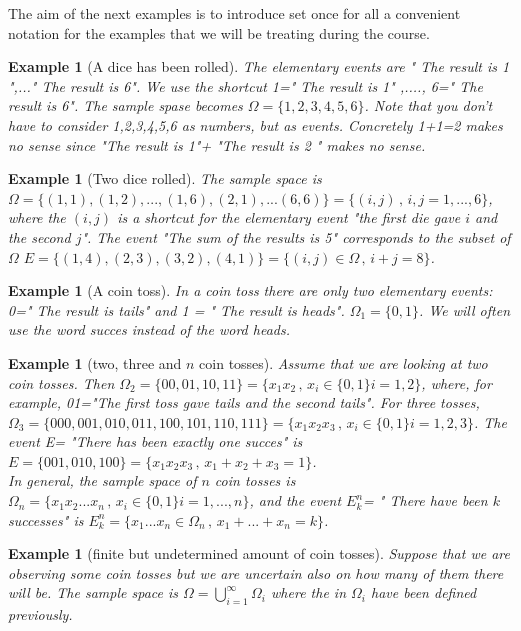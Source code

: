 \documentclass[12pt]{article}
\newtheorem{example}[theorem]{Example}
\newcommand{\<}{{\langle \!\! \langle}}
\renewcommand{\>}{{\rangle \!\! \rangle}}
\begin{document}
The aim of the next examples is to introduce set once for all a convenient notation for the examples that we will be treating during the course.

\begin{example}[A dice has been rolled]
The elementary events are " The result is 1 ",..." The result is 6". We use the shortcut 1=" The result is 1" ,...., 6=" The result is 6". The sample spase becomes $\Omega=\{1,2,3,4,5,6\}$. Note that you don't have to consider  1,2,3,4,5,6 as numbers, but as events. Concretely 1+1=2 makes no sense since "The result is 1"+ "The result is 2 " makes no sense.
\end{example}

\begin{example}[Two dice rolled]
The sample space is $\Omega=\{(1,1),(1,2),...,(1,6),(2,1),...(6,6) \}=\{(i,j)\,,\, i,j=1,...,6\}$, where the $(i,j)$ is a shortcut for the elementary event "the first die gave $i$ and the second $j$". The event "The sum of the results is 5" corresponds to the subset of $\Omega$ $E=\{(1,4),(2,3),(3,2),(4,1)\}=\{(i,j)\in \Omega \,,\,i+j=8\}$.   
\end{example}

\begin{example}[A coin toss]
In a coin toss there are only two elementary events: 0=" The result is tails" and 1 = " The result is heads". $\Omega_1=\{0,1\}$. We will often use the word succes instead of the word heads.   
\end{example}

\begin{example}[two, three and $n$ coin tosses]
Assume that we are looking at two coin tosses. Then $\Omega_2=\{00,01,10,11\}= \{x_1x_2\,,\, x_i\in\{0,1\} i=1,2\}$, where, for example,  01="The first toss gave tails and the second tails". For three tosses, $\Omega_3=\{000,001,010,011,100,101,110,111\}=\{x_1x_2x_3\,,\,x_i\in\{0,1\} i=1,2,3\}$. The event E= "There has been exactly one succes" is $E=\{001,010,100\}=\{x_1x_2x_3\,,\,x_1+x_2+x_3=1\}$. \\
In general, the sample space of $n$ coin tosses is $\Omega_n=\{x_1x_2...x_n\,,\,x_i\in\{0,1\} i=1,...,n\}$, and the event $E^n_k$= " There have been $k$ successes" is $ E^n_k=\{x_1...x_n\in \Omega_n\,,\,x_1+...+x_n=k\}$.     
\end{example}

\begin{example}[finite but undetermined amount of coin tosses]
Suppose that we are observing some coin tosses but we are uncertain also on how many of them there will be. The sample space is $\Omega=\bigcup_{i=1}^\infty \Omega_i$ where the  in $\Omega_i$ have been defined previously. 

\end{example}
\end{document}

